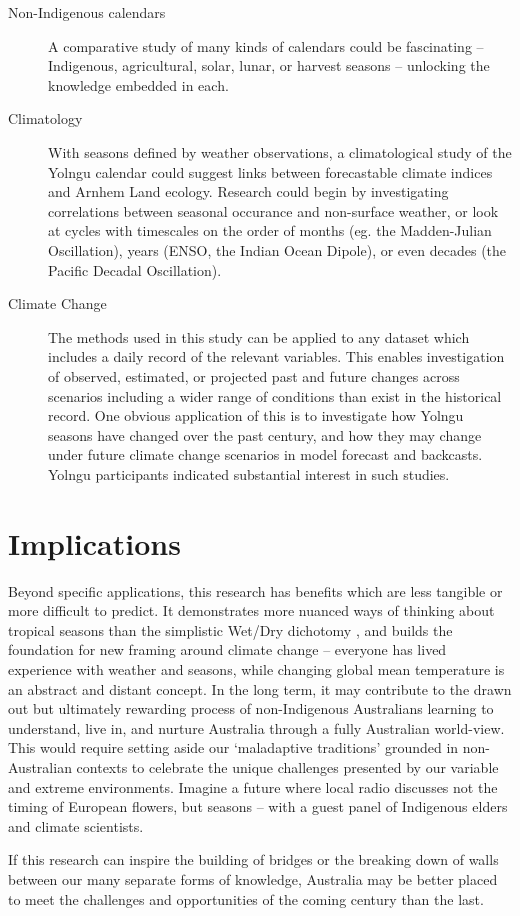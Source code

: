 \begin{description}
\item[Non-Indigenous calendars]
    A comparative study of many kinds of calendars could be fascinating --
    Indigenous, agricultural, solar, lunar, or harvest seasons -- unlocking
    the knowledge embedded in each.

\item[Climatology]
    With seasons defined by weather observations, a climatological study of the
    Yolngu calendar could suggest links between forecastable climate indices
    and Arnhem Land ecology.  Research could begin by investigating correlations
    between seasonal occurance and non-surface weather, or look at cycles with
    timescales on the order of months (eg. the Madden-Julian Oscillation), years (ENSO,
    the Indian Ocean Dipole), or even decades (the Pacific Decadal Oscillation).

\item[Climate Change]
    The methods used in this study can be applied to any dataset which
    includes a daily record of the relevant variables.  This enables
    investigation of observed, estimated, or projected past and future changes
    across scenarios including a wider range of conditions than exist in the historical record.
    One obvious application of this is to investigate how Yolngu seasons have
    changed over the past century, and how they may change under future climate
    change scenarios in model forecast and backcasts.  Yolngu participants
    indicated substantial interest in such studies.
\end{description}


\clearpage
\section{Implications}

Beyond specific applications, this research has benefits which are less
tangible or more difficult to predict.
It demonstrates more nuanced ways of thinking about tropical seasons than the
simplistic Wet/Dry dichotomy \citep{willmett2009}, and builds the foundation
for new framing around climate change -- everyone has lived experience with
weather and seasons, while changing global mean temperature is an abstract and
distant concept.
%
In the long term, it may contribute to the drawn out but ultimately rewarding process of
non-Indigenous Australians learning to understand, live in, and nurture
Australia through a fully Australian world-view.  This would require setting
aside our `maladaptive traditions' grounded in non-Australian contexts
\citep{flannery1994} to celebrate the unique challenges presented by our variable and extreme
environments.  Imagine a future where local radio discusses not the timing of
European flowers, but seasons -- with a guest panel of Indigenous elders and
climate scientists.

If this research can inspire the building of bridges or the breaking down of walls
between our many separate forms of knowledge, Australia may be better placed
to meet the challenges and opportunities of the coming century than the last.

